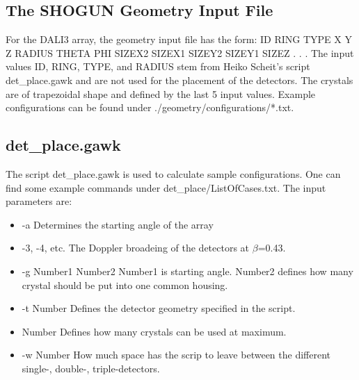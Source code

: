 \documentclass[12pt]{book}
\begin{document}
\subsection{The SHOGUN Geometry Input File}

For the DALI3 array, the geometry input file has the form:\hfill{} 
\linebreak
\linebreak
{\ttfamily ID RING TYPE X Y Z RADIUS THETA PHI SIZEX2 SIZEX1 SIZEY2 SIZEY1 SIZEZ}\linebreak
{\ttfamily .}\linebreak
{\ttfamily .}\linebreak
{\ttfamily .}\linebreak
\linebreak
\linebreak
The input values {\ttfamily ID, RING, TYPE,} and {\ttfamily RADIUS} stem from Heiko Scheit's 
script {\ttfamily det\_place.gawk} and are not used for the placement of the detectors. The crystals are of trapezoidal 
shape and defined by the last 5 input values. Example configurations can be found under  
{\ttfamily ./geometry/configurations/*.txt}.

\subsection {{\ttfamily det\_place.gawk}}
The script {\ttfamily det\_place.gawk} is used to calculate sample configurations.
One can find some example commands under {\ttfamily det\_place/ListOfCases.txt}.
The input parameters are:
\begin{itemize}
\item -a \hfill{} \linebreak
  Determines the starting angle of the array
\item -3, -4, etc.\hfill{} \linebreak
  The Doppler broadeing of the detectors at $\beta$=0.43.
\item -g Number1 Number2\hfill{} \linebreak
  Number1 is starting angle. Number2 defines how many crystal should be put into one common housing.
\item -t Number\hfill{} \linebreak
Defines the detector geometry specified in the script.
\item Number\hfill{} \linebreak
  Defines how many crystals can be used at maximum.
\item -w Number\hfill{} \linebreak
  How much space has the scrip to leave between the different single-, double-, triple-detectors.
\end{itemize}
\end{document}
